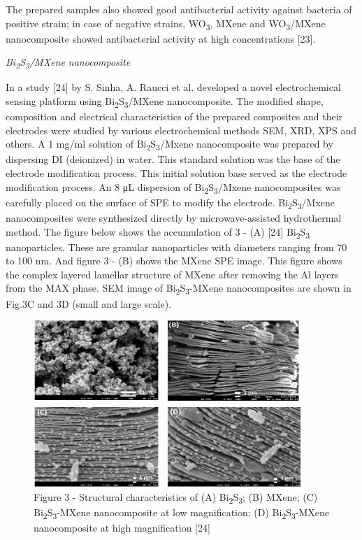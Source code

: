 \begin{multicols}{2}
The prepared samples also showed good antibacterial activity
against bacteria of positive strain; in case of negative strains,
WO\textsubscript{3}, MXene and WO\textsubscript{3}/MXene
nanocomposite showed antibacterial activity at high concentrations
{[}23{]}.

\emph{Bi\textsubscript{2}S\textsubscript{3}/MXene nanocomposite}

In a study {[}24{]} by S. Sinha, A. Raucci et al. developed a
novel electrochemical sensing platform using
Bi\textsubscript{2}S\textsubscript{3}/MXene nanocomposite. The
modified shape, composition and electrical characteristics of the
prepared composites and their electrodes were studied by various
electrochemical methods SEM, XRD, XPS and others. A 1 mg/ml
solution of Bi\textsubscript{2}S\textsubscript{3}/Mxene
nanocomposite was prepared by dispersing DI (deionized) in water.
This standard solution was the base of the electrode
modification process. This initial solution base served as the
electrode modification process. An 8 μL dispersion of
Bi\textsubscript{2}S\textsubscript{3}/Mxene nanocomposites was
carefully placed on the surface of SPE to modify the electrode.
Bi\textsubscript{2}S\textsubscript{3}/Mxene nanocomposites were
synthesized directly by microwave-assisted hydrothermal method.
The figure below shows the accumulation of 3 - (A) {[}24{]}
Bi\textsubscript{2}S\textsubscript{3} nanoparticles. These are
granular nanoparticles with diameters ranging from 70 to 100 nm.
And figure 3 - (B) shows the MXene SPE image. This figure
shows the complex layered lamellar structure of MXene after
removing the Al layers from the MAX phase. SEM image of
Bi\textsubscript{2}S\textsubscript{3}-MXene nanocomposites are
shown in Fig.3C and 3D (small and large scale).
\end{multicols}

\begin{figure}[H]
	\centering
	\includegraphics[width=0.9\textwidth]{media/chem2/image14}
	\caption*{Figure 3 - Structural characteristics of (A) Bi\textsubscript{2}S\textsubscript{3}; (B) MXene; (C) Bi\textsubscript{2}S\textsubscript{3}-MXene nanocomposite at low magnification; (D) Bi\textsubscript{2}S\textsubscript{3}-MXene nanocomposite at high magnification {[}24{]}}
\end{figure}


